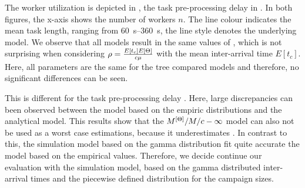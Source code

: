 The worker utilization \workerUtilization is depicted in , the task pre-processing delay \preTaskProcessingDelay in .
In both figures, the x-axis shows the number of workers \(n\).
The line colour indicates the mean task length, ranging from \SIrange{60}{360}{\second}, the line style denotes the underlying model.
We observe that all models result in the same values of \workerUtilization, which is not surprising when considering \(\rho = \frac{E[t_c] E[\Theta]}{c\mu}\) with the mean inter-arrival time \(E[t_c]\).
Here, all parameters are the same for the tree compared models and therefore, no significant differences can be seen.

This is different for the task pre-processing delay \preTaskProcessingDelay. 
Here, large discrepancies can been observed between the model based on the empiric distributions and the analytical model.
This results show that the \(M^{[\Theta]}/M/c-\infty\) model can also not be used as a worst case estimations, because it underestimates \preTaskProcessingDelay.
In contrast to this, the simulation model based on the gamma distribution fit quite accurate the model based on the empirical values.
Therefore, we decide continue our evaluation with the simulation model, based on the gamma distributed inter-arrival times and the piecewise defined distribution for the campaign sizes.
